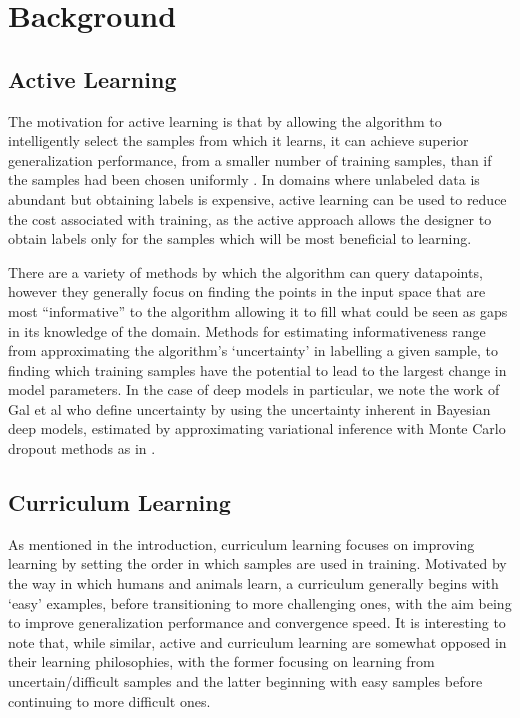 \documentclass[a4paper,11pt]{article}
\begin{document}
\section{Background}
\subsection*{Active Learning}
The motivation for active learning is that by allowing the algorithm to intelligently select the samples from which it learns, it can achieve superior generalization performance, from a smaller number of training samples, than if the samples had been chosen uniformly \cite{Cohn 1994}. In domains where unlabeled data is abundant but obtaining labels is expensive, active learning can be used to reduce the cost associated with training, as the active approach allows the designer to obtain labels only for the samples which will be most beneficial to learning.

There are a variety of methods by which the algorithm can query datapoints, however they generally focus on finding the points in the input space that are most ``informative'' to the algorithm \cite{Settles 2009} allowing it to fill what could be seen as gaps in its knowledge of the domain. Methods for estimating informativeness range from approximating the algorithm's `uncertainty' in labelling a given sample, to finding which training samples have the potential to lead to the largest change in model parameters. In the case of deep models in particular, we note the work of Gal et al \cite{Gal 2016} who define uncertainty by using the uncertainty inherent in Bayesian deep models, estimated by approximating variational inference with Monte Carlo dropout methods as in \cite{Gal 2016 2}.

\subsection*{Curriculum Learning}
As mentioned in the introduction, curriculum learning focuses on improving learning by setting the order in which samples are used in training. Motivated by the way in which humans and animals learn, a curriculum generally begins with `easy' examples, before transitioning to more challenging ones, with the aim being to improve generalization performance and convergence speed. It is interesting to note that, while similar, active and curriculum learning are somewhat opposed in their learning philosophies, with the former focusing on learning from uncertain/difficult samples and the latter beginning with easy samples before continuing to more difficult ones. 
\end{document}

